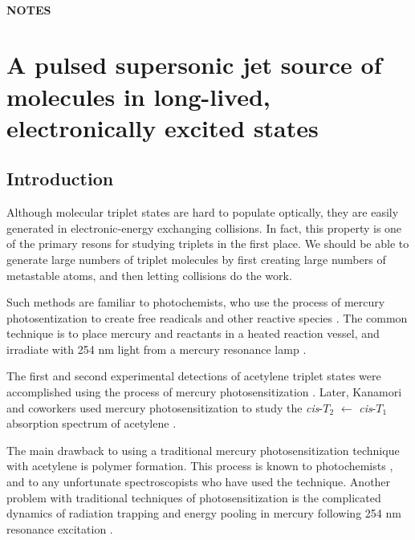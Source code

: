 \documentclass[12pt]{mitthesis}
\begin{document}
\tableofcontents
\clearpage

\subsubsection*{NOTES}
\clearpage

\chapter{A pulsed supersonic jet source of molecules in long-lived,
  electronically excited states
}

\section{Introduction}


Although molecular triplet states are hard to populate optically, they
are easily generated in electronic-energy exchanging collisions.  In
fact, this property is one of the primary resons for studying triplets
in the first place.  We should be able to generate large numbers of
triplet molecules by first creating large numbers of metastable atoms,
and then letting collisions do the work.

Such methods are familiar to photochemists, who use the process of
mercury photosentization to create free readicals and other reactive
species \cite{brown89, brown88, crabtree92, cvetanovic64, phillips74,
  strausz70}.  The common technique is to place mercury and reactants
in a heated reaction vessel, and irradiate with 254 nm light from a
mercury resonance lamp \cite{brown87}.

The first and second experimental detections of acetylene triplet
states were accomplished using the process of mercury
photosensitization \cite{burton72, wendt79}.  Later, Kanamori and
coworkers used mercury photosensitization to study the
\emph{cis}-$T_2$ $\leftarrow$ \emph{cis}-$T_1$ absorption spectrum of
acetylene \cite{kanamori07}.

The main drawback to using a traditional mercury photosensitization
technique with acetylene is polymer formation.  This process is known
to photochemists \cite{shida58, leroy44}, and to any unfortunate
spectroscopists who have used the technique.  Another problem with
traditional techniques of photosensitization is the complicated
dynamics of radiation trapping and energy pooling in mercury following
254 nm resonance excitation \cite{menningen00, herd05, majetich89,
  majetich91}.
\end{document}

